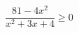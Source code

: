 \begin{ex}[type=inequality]
	\begin{condition}
		\( \dfrac{81-4x^2}{x^2+3x+4}\ge0 \)
	\end{condition}
\end{ex}